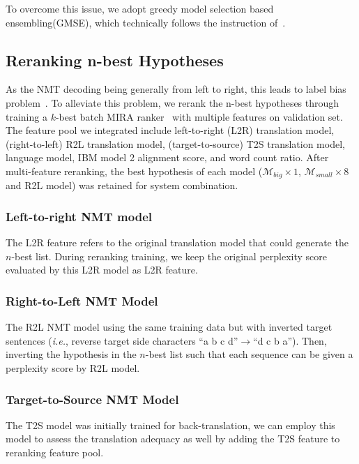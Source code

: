 \documentclass[11pt,a4paper]{article}
\begin{document}
To overcome this issue, we adopt greedy model selection based ensembling(GMSE), which technically follows the instruction of~\cite{deng-etal-2018-alibabas}.

\subsection{Reranking n-best Hypotheses}
\label{ssec:rerank}



As the NMT decoding being generally from left to right, this leads to label bias problem~\cite{lafferty2001conditional}. To alleviate this problem, we rerank the n-best hypotheses through training a $k$-best batch MIRA ranker~\cite{Cherry:2012:BTS:2382029.2382089} with multiple features on validation set. The feature pool we integrated include left-to-right (L2R) translation model, (right-to-left) R2L translation model, (target-to-source) T2S translation model, language model, IBM model 2 alignment score, and word count ratio. After multi-feature reranking, the best hypothesis of each model ($\mathcal{M}_{big}\times1$, $\mathcal{M}_{small}\times8$ and R2L model) was retained for system combination.

\subsubsection{Left-to-right NMT model}
The L2R feature refers to the original translation model that could generate the $n$-best list. During reranking training, we keep the original perplexity score evaluated by this L2R model as L2R feature.

\subsubsection{Right-to-Left NMT Model}
The R2L NMT model using the same training data but with inverted target sentences (\textit{i.e.}, reverse target side characters ``a b c d''$\rightarrow$``d c b a''). Then, inverting the hypothesis in the $n$-best list such that each sequence can be given a perplexity score by R2L model.

\subsubsection{Target-to-Source NMT Model}
The T2S model was initially trained for back-translation, we can employ this model to assess the translation adequacy as well by adding the T2S feature to reranking feature pool.
\end{document}
